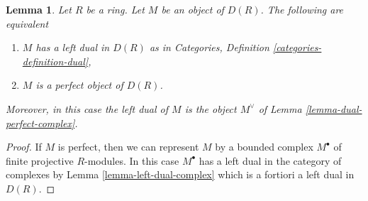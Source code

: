 \documentclass[10pt,a4paper]{amsart}
\theoremstyle{plain}
\newtheorem{lemma}[subsection]{Lemma}
\theoremstyle{definition}
\theoremstyle{remark}
\numberwithin{equation}{subsection}
\begin{document}
\begin{lemma}
\label{lemma-have-dual-derived}
Let $R$ be a ring. Let $M$ be an object of $D(R)$. The following
are equivalent
\begin{enumerate}
\item $M$ has a left dual in $D(R)$ as in
Categories, Definition \ref{categories-definition-dual},
\item $M$ is a perfect object of $D(R)$.
\end{enumerate}
Moreover, in this case the left dual of $M$ is the object
$M^\vee$ of Lemma \ref{lemma-dual-perfect-complex}.
\end{lemma}

\begin{proof}
If $M$ is perfect, then we can represent $M$ by a bounded complex
$M^\bullet$ of finite projective $R$-modules. In this case $M^\bullet$
has a left dual in the category of complexes by
Lemma \ref{lemma-left-dual-complex}
which is a fortiori a left dual in $D(R)$.


\end{proof}
\end{document}
